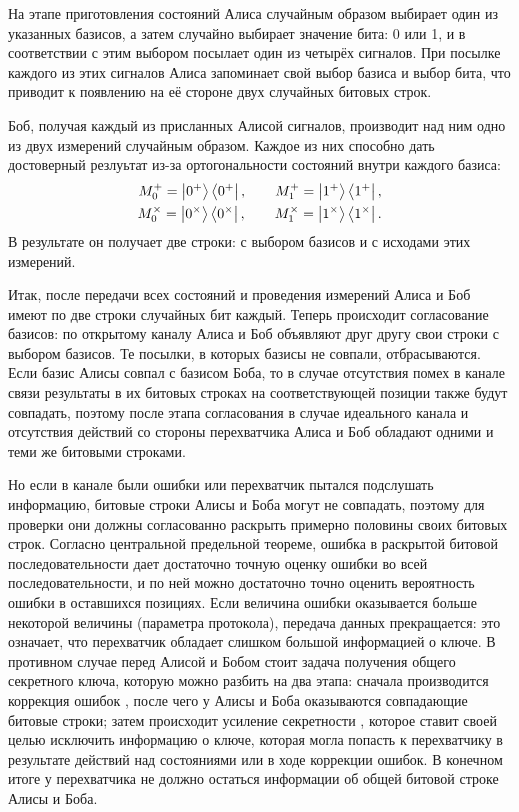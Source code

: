 На этапе приготовления состояний Алиса случайным образом выбирает один из указанных базисов, а затем случайно выбирает значение бита: 0 или 1, и в соответствии с этим выбором посылает один из четырёх сигналов. При посылке каждого из этих сигналов Алиса запоминает свой выбор базиса и выбор бита, что приводит к появлению на её стороне двух случайных битовых строк.

Боб, получая каждый из присланных Алисой сигналов, производит над ним одно из двух измерений случайным образом. Каждое из них способно дать достоверный резлуьтат из-за ортогональности состояний внутри каждого базиса:
\begin{eqnarray}\label{bb84_bob_measurements}
  M_0^+ = \left| 0^+ \right\rangle\left\langle 0^+ \right|, \qquad M_1^+ = \left| 1^+ \right\rangle\left\langle 1^+ \right|, \nonumber\\
  M_0^\times = \left| 0^\times \right\rangle\left\langle 0^\times \right|, \qquad M_1^\times = \left| 1^\times \right\rangle\left\langle 1^\times \right|.
\end{eqnarray}
В результате он получает две строки: с выбором базисов и с исходами этих измерений.

Итак, после передачи всех состояний и проведения измерений Алиса и Боб имеют по две строки случайных бит каждый. Теперь происходит согласование базисов: по открытому каналу Алиса и Боб объявляют друг другу свои строки с выбором базисов. Те посылки, в которых базисы не совпали, отбрасываются. Если базис Алисы совпал с базисом Боба, то в случае отсутствия помех в канале связи результаты в их битовых строках на соответствующей позиции также будут совпадать, поэтому после этапа согласования в случае идеального канала и отсутствия действий со стороны перехватчика Алиса и Боб обладают одними и теми же битовыми строками.

Но если в канале были ошибки или перехватчик пытался подслушать информацию, битовые строки Алисы и Боба могут не совпадать, поэтому для проверки они должны согласованно раскрыть примерно половины своих битовых строк. Согласно центральной предельной теореме, ошибка в раскрытой битовой последовательности дает достаточно точную оценку ошибки во всей последовательности, и по ней можно достаточно точно оценить вероятность ошибки в оставшихся позициях. Если величина ошибки оказывается больше некоторой величины (параметра протокола), передача данных прекращается: это означает, что перехватчик обладает слишком большой информацией о ключе. В противном случае перед Алисой и Бобом стоит задача получения общего секретного ключа, которую можно разбить на два этапа: сначала производится коррекция ошибок \cite{information_reconcilation}, после чего у Алисы и Боба оказываются совпадающие битовые строки; затем происходит усиление секретности \cite{privacy_amplification}, которое ставит своей целью исключить информацию о 
ключе, которая могла попасть к перехватчику в результате действий над состояниями или в ходе коррекции ошибок. В конечном итоге у перехватчика не должно остаться информации об общей битовой строке Алисы и Боба.

